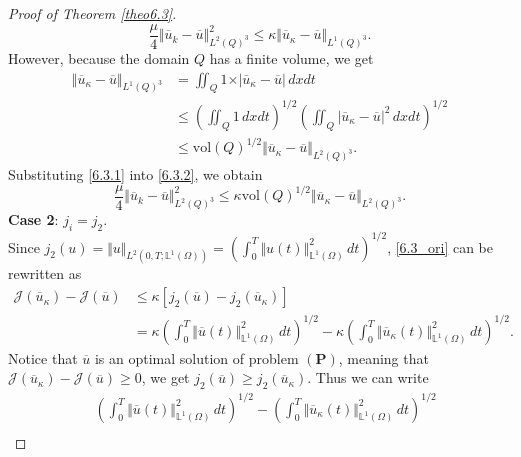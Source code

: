 \documentclass[reqno]{amsart}
\begin{document}
\begin{proof}[Proof of Theorem \ref{theo6.3}]
\begin{equation}
			\frac{\mu}{4} \Vert \overline{u}_k - \overline{u} \Vert_{L^2(Q)^3}^2 \leq \kappa \Vert \overline{u}_\kappa - \overline{u} \Vert_{L^1(Q)^3}.
		\end{equation}
		However, because the domain $Q$ has a finite volume, we get
		\begin{equation} \label{6.3.1}
			\begin{aligned}
				\Vert \overline{u}_\kappa - \overline{u} \Vert_{L^1(Q)^3} &=\iint_Q 1\times \vert \overline{u}_\kappa - \overline{u} \vert \, dxdt \\
				& \leq \left( \iint_Q 1 \, dxdt \right)^{1/2} \left( \iint_Q \vert \overline{u}_\kappa - \overline{u} \vert^2 \, dxdt \right)^{1/2}\\
				&\leq \text{vol}(Q)^{1/2} \Vert \overline{u}_\kappa - \overline{u} \Vert_{L^2(Q)^3}.
			\end{aligned}
		\end{equation}
		Substituting \eqref{6.3.1} into \eqref{6.3.2}, we obtain
		\begin{equation} \label{sta_j1}
			\frac{\mu}{4} \Vert \overline{u}_k - \overline{u} \Vert_{L^2(Q)^3}^2 \leq \kappa \text{vol}(Q)^{1/2} \Vert \overline{u}_\kappa - \overline{u} \Vert_{L^2(Q)^3}.
		\end{equation}
		\textbf{Case 2}: $j_i=j_2$.\\
		Since $\displaystyle j_2(u)=\Vert u\Vert_{L^2(0,T;\mathbb{L}^1(\Omega))}=\left( \int_0^T \Vert u(t) \Vert_{\mathbb{L}^1(\Omega)}^2 \, dt \right)^{1/2}$, \eqref{6.3_ori} can be rewritten as
		\begin{equation} \label{6.3.4}
			\begin{aligned}
				\mathcal{J}(\overline{u}_{\kappa}) - \mathcal{J}(\overline{u}) &\leq \kappa \left[ j_2(\overline{u}) - j_2 (\overline{u}_{\kappa}) \right]\\
				&= \kappa \left( \int_0^T \Vert \overline{u}(t) \Vert_{\mathbb{L}^1(\Omega)}^2 \, dt \right)^{1/2} - \kappa \left( \int_0^T \Vert \overline{u}_{\kappa}(t) \Vert_{\mathbb{L}^1(\Omega)}^2 \, dt \right)^{1/2}.
			\end{aligned}
		\end{equation}
		Notice that $\overline{u}$ is an optimal solution of problem $(\textbf{P})$, meaning that $\mathcal{J}(\overline{u}_{\kappa}) - \mathcal{J}(\overline{u})\geq 0$, we get $j_2(\overline{u}) \geq j_2(\overline{u}_{\kappa})$. Thus we can write
		\begin{align*}
			&\left( \int_0^T \Vert \overline{u}(t) \Vert_{\mathbb{L}^1(\Omega)}^2 \, dt \right)^{1/2} - \left( \int_0^T \Vert \overline{u}_{\kappa}(t) \Vert_{\mathbb{L}^1(\Omega)}^2 \, dt \right)^{1/2} \\

\end{align*}
\end{proof}
\end{document}
